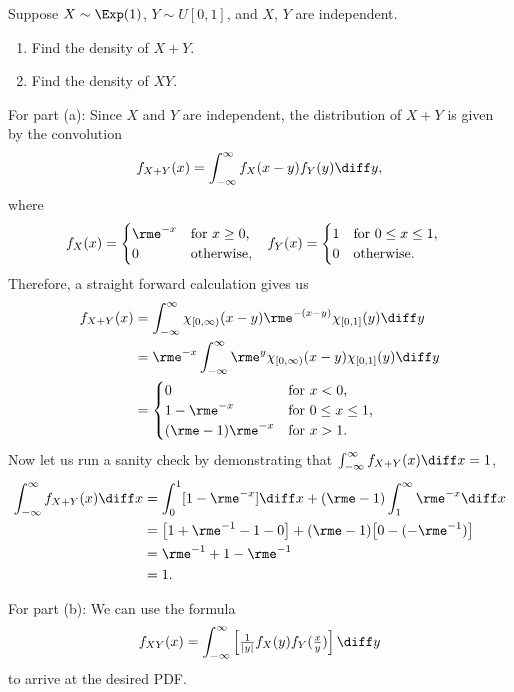 \begin{problem}[Handout 17, \# 16]
  Suppose \(X\sim\Exp(1)\), \(Y\sim U[0,1]\), and \(X\), \(Y\) are
  independent.
  \begin{enumerate}[label=(\alph*),noitemsep]
  \item Find the density of \(X+Y\).
  \item Find the density of \(XY\).
  \end{enumerate}
\end{problem}
\begin{solution}
  For part (a): Since \(X\) and \(Y\) are independent, the distribution of
  \(X+Y\) is given by the convolution
  \[
    f_{X+Y}(x)=\int_{-\infty}^\infty f_X(x-y)f_Y(y)\diff y,
  \]
  where
  \begin{align*}
    f_X(x)
      &=\begin{cases}
        \rme^{-x}&\text{for \(x\geq 0\),}\\
        0&\text{otherwise,}
      \end{cases}
    &f_Y(x)
       &=\begin{cases}
         1&\text{for \(0\leq x\leq 1\),}\\
         0&\text{otherwise.}
       \end{cases}
  \end{align*}
  Therefore, a straight forward calculation gives us
  \begin{align*}
    f_{X+Y}(x)
    &=\int_{-\infty}^\infty
      \chi_{[0,\infty)}(x-y)\rme^{-(x-y)}\chi_{[0,1]}(y)\diff y\\
    &=\rme^{-x}\int_{-\infty}^{\infty}\rme^y\chi_{[0,\infty)}(x-y)\chi_{[0,1]}(y)\diff
      y\\
    &=\begin{cases}
        0&\text{for \(x<0\),}\\
        1-\rme^{-x}&\text{for \(0\leq x\leq 1\),}\\
        (\rme-1)\rme^{-x}&\text{for \(x>1\).}
      \end{cases}
  \end{align*}
  Now let us run a sanity check by demonstrating that
  \(\int_{-\infty}^\infty f_{X+Y}(x)\diff x=1\),
  \begin{align*}
    \int_{-\infty}^\infty f_{X+Y}(x)\diff x
    &=\int_0^1 [1-\rme^{-x}]\diff x+(\rme-1)\int_1^\infty\rme^{-x}\diff x\\
    &=\bigl[1+\rme^{-1}-1-0\bigr]+(\rme-1)\bigl[0-(-\rme^{-1})\bigr]\\
    &=\rme^{-1}+1-\rme^{-1}\\
    &=1.
  \end{align*}

  For part (b): We can use the formula
  \[
    f_{XY}(x)=\int_{-\infty}^\infty
    \left[\tfrac{1}{|y|}f_X(y)f_Y(\tfrac{x}{y})\right]\diff y
  \]
  to arrive at the desired PDF.
\end{solution}
\newpage

